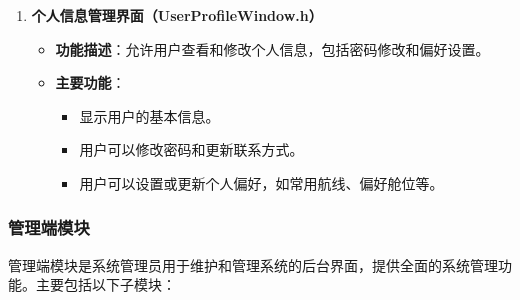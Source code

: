 \documentclass[UTF8, a4paper,12pt]{ctexart}
\begin{document}
\begin{enumerate}
    \item \textbf{个人信息管理界面（UserProfileWindow.h）}
    \begin{itemize}
        \item \textbf{功能描述}：允许用户查看和修改个人信息，包括密码修改和偏好设置。
        \item \textbf{主要功能}：
        \begin{itemize}
            \item 显示用户的基本信息。
            \item 用户可以修改密码和更新联系方式。
            \item 用户可以设置或更新个人偏好，如常用航线、偏好舱位等。
        \end{itemize}
    \end{itemize}
\end{enumerate}

\subsubsection{管理端模块}

管理端模块是系统管理员用于维护和管理系统的后台界面，提供全面的系统管理功能。主要包括以下子模块：
\end{document}
